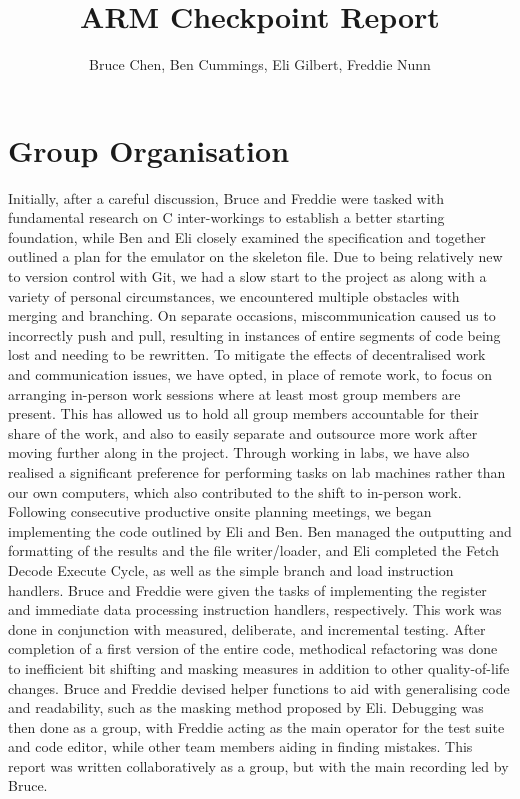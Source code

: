\documentclass[11pt]{article}
\begin{document}
\title{ARM Checkpoint Report}
\author{Bruce Chen, Ben Cummings, Eli Gilbert, Freddie Nunn}

\maketitle

\section{Group Organisation}

Initially, after a careful discussion, Bruce and Freddie were tasked with fundamental research on C inter-workings to establish a better starting foundation, while Ben and Eli closely examined the specification and together outlined a plan for the emulator on the skeleton file. Due to being relatively new to version control with Git, we had a slow start to the project as along with a variety of personal circumstances, we encountered multiple obstacles with merging and branching. On separate occasions, miscommunication caused us to incorrectly push and pull, resulting in instances of entire segments of code being lost and needing to be rewritten. \newline \indent To mitigate the effects of decentralised work and communication issues, we have opted, in place of remote work, to focus on arranging in-person work sessions where at least most group members are present. This has allowed us to hold all group members accountable for their share of the work, and also to easily separate and outsource more work after moving further along in the project. Through working in labs, we have also realised a significant preference for performing tasks on lab machines rather than our own computers, which also contributed to the shift to in-person work. \newline \indent Following consecutive productive onsite planning meetings, we began implementing the code outlined by Eli and Ben. Ben managed the outputting and formatting of the results and the file writer/loader, and Eli completed the Fetch Decode Execute Cycle, as well as the simple branch and load instruction handlers. Bruce and Freddie were given the tasks of implementing the register and immediate data processing instruction handlers, respectively. This work was done in conjunction with measured, deliberate, and incremental testing. \newline \indent After completion of a first version of the entire code, methodical refactoring was done to inefficient bit shifting and masking measures in addition to other quality-of-life changes. Bruce and Freddie devised helper functions to aid with generalising code and readability, such as the masking method proposed by Eli. Debugging was then done as a group, with Freddie acting as the main operator for the test suite and code editor, while other team members aiding in finding mistakes. This report was written collaboratively as a group, but with the main recording led by Bruce.
 
\end{document}
